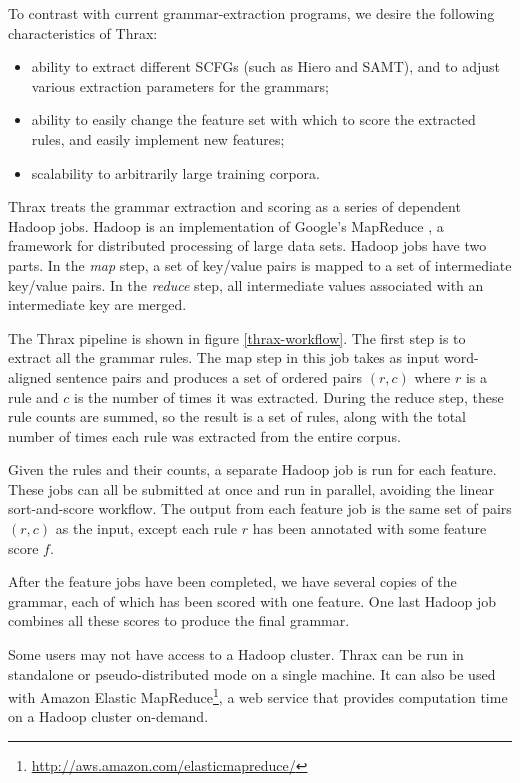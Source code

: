 \documentclass[11pt]{article}
\begin{document}
To contrast with current grammar-extraction programs, we desire the following characteristics of Thrax:
\begin{itemize}
\item ability to extract different SCFGs (such as Hiero and SAMT), and to adjust various extraction parameters for the grammars;
\item ability to easily change the feature set with which to score the extracted rules, and easily implement new features;
\item scalability to arbitrarily large training corpora.
\end{itemize}

Thrax treats the grammar extraction and scoring as a series of dependent Hadoop jobs. Hadoop is an implementation of Google's MapReduce \cite{mapreduce}, a framework for distributed processing of large data sets. Hadoop jobs have two parts. In the {\em map} step, a set of key/value pairs is mapped to a set of intermediate key/value pairs. In the {\em reduce} step, all intermediate values associated with an intermediate key are merged.

The Thrax pipeline is shown in figure \ref{thrax-workflow}. The first step is to extract all the grammar rules. The map step in this job takes as input word-aligned sentence pairs and produces a set of ordered pairs $(r,c)$ where $r$ is a rule and $c$ is the number of times it was extracted. During the reduce step, these rule counts are summed, so the result is a set of rules, along with the total number of times each rule was extracted from the entire corpus.

Given the rules and their counts, a separate Hadoop job is run for each feature. These jobs can all be submitted at once and run in parallel, avoiding the linear sort-and-score workflow. The output from each feature job is the same set of pairs $(r,c)$ as the input, except each rule $r$ has been annotated with some feature score $f$.

After the feature jobs have been completed, we have several copies of the grammar, each of which has been scored with one feature. One last Hadoop job combines all these scores to produce the final grammar.

Some users may not have access to a Hadoop cluster. Thrax can be run in standalone or pseudo-distributed mode on a single machine. It can also be used with Amazon Elastic MapReduce\footnote{\url{http://aws.amazon.com/elasticmapreduce/}}, a web service that provides computation time on a Hadoop cluster on-demand.
\end{document}
